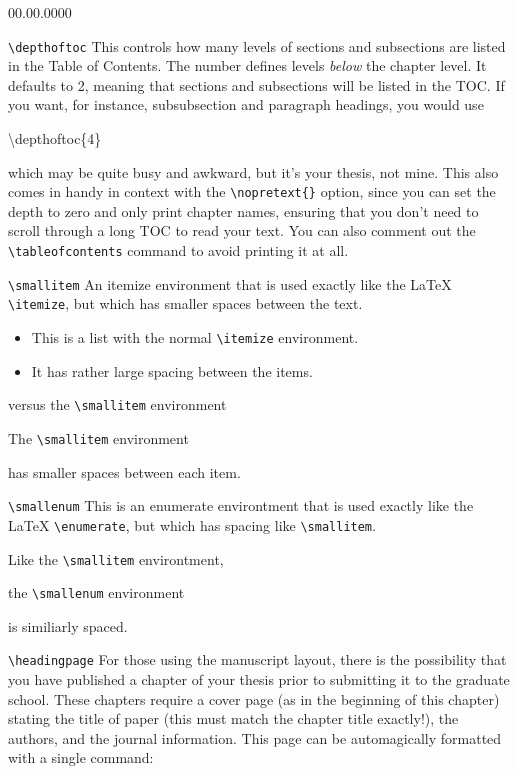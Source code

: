 \begin{lyxlist}{00.00.0000}
\item [\texttt{\textbackslash{}depthoftoc}]This controls how many levels
of sections and subsections are listed in the Table of Contents. The
number defines levels \emph{below} the chapter level. It defaults
to 2, meaning that sections and subsections will be listed in the
TOC. If you want, for instance, subsubsection and paragraph headings,
you would use

\begin{lyxcode}
\textbackslash{}depthoftoc\{4\}
\end{lyxcode}
which may be quite busy and awkward, but it's your thesis, not mine.
This also comes in handy in context with the \texttt{\textbackslash{}nopretext\{\}}
option, since you can set the depth to zero and only print chapter
names, ensuring that you don't need to scroll through a long TOC to
read your text. You can also comment out the \texttt{\textbackslash{}tableofcontents}
command to avoid printing it at all.

\item [\texttt{\textbackslash{}smallitem}]An itemize environment that is
used exactly like the \LaTeX{} \texttt{\textbackslash{}itemize}, but
which has smaller spaces between the text.

\begin{itemize}
\item This is a list with the normal \texttt{\textbackslash{}itemize} environment.
\item It has rather large spacing between the items.
\end{itemize}
versus the \texttt{\textbackslash{}smallitem} environment

\begin{smallitem}
\item The \texttt{\textbackslash{}smallitem} environment
\item has smaller spaces between each item.
\end{smallitem}
\item [\texttt{\textbackslash{}smallenum}]This is an enumerate environtment
that is used exactly like the \LaTeX{} \texttt{\textbackslash{}enumerate},
but which has spacing like \texttt{\textbackslash{}smallitem}.

\begin{smallenum}
\item Like the \texttt{\textbackslash{}smallitem} environtment,
\item the \texttt{\textbackslash{}smallenum} environment
\item is similiarly spaced.
\end{smallenum}
\item [\texttt{\textbackslash{}headingpage}]For those using the manuscript
layout, there is the possibility that you have published a chapter
of your thesis prior to submitting it to the graduate school. These
chapters require a cover page (as in the beginning of this chapter)
stating the title of paper (this must match the chapter title exactly!),
the authors, and the journal information. This page can be automagically
formatted with a single command:


\end{lyxlist}
